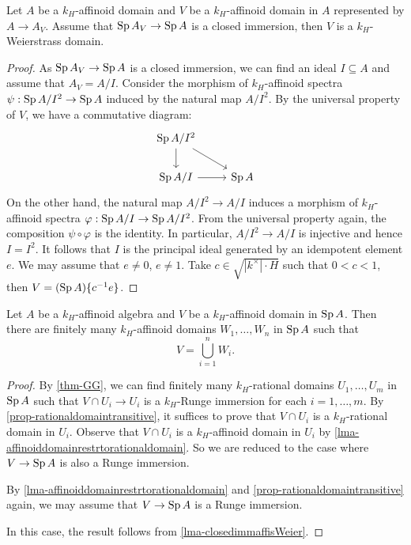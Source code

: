 \begin{lemma}\label{lma-closedimmaffisWeier}
    Let $A$ be a $k_H$-affinoid domain and $V$ be a $k_H$-affinoid domain in $A$ represented by $A\rightarrow A_V$. Assume that $\operatorname{Sp} A_V\rightarrow \operatorname{Sp} A$ is a closed immersion, then $V$ is a $k_H$-Weierstrass domain. 
\end{lemma}
\begin{proof}
    As $\operatorname{Sp} A_V\rightarrow \operatorname{Sp} A$ is a closed immersion, we can find an ideal $I\subseteq  A$ and assume that $A_V=A/I$. Consider the morphism of $k_H$-affinoid spectra $\psi:\operatorname{Sp} A/I^2\rightarrow \operatorname{Sp} A$ induced by the natural map $A/I^2$. By the universal property of $V$, we have a commutative diagram:
    \[
        \begin{tikzcd}
            \Sp A/I^2 \arrow[rd] \arrow[d] &       \\
            \Sp A/I \arrow[r]              & \Sp A
        \end{tikzcd}  
    \]
    On the other hand, the natural map $A/I^2\rightarrow A/I$ induces a morphism of $k_H$-affinoid spectra $\varphi:\operatorname{Sp} A/I\rightarrow \operatorname{Sp} A/I^2$. From the universal property again, the composition $\psi\circ \varphi$ is the identity. In particular, $A/I^2\rightarrow A/I$ is injective and hence $I=I^2$. It follows that $I$ is the principal ideal generated by an idempotent element $e$. We may assume that $e\neq 0$, $e\neq 1$. Take $c\in \sqrt{|k^{\times}|\cdot H}$ such that $0<c<1$, then $V=(\operatorname{Sp} A)\{c^{-1}e\}$.
\end{proof}


\begin{corollary}\label{cor-GG}
    Let $A$ be a $k_H$-affinoid algebra and $V$ be a $k_H$-affinoid domain in $\operatorname{Sp} A$. Then there are finitely many $k_H$-affinoid domains $W_1,\ldots,W_n$ in $\operatorname{Sp} A$ such that
    \[
        V=\bigcup_{i=1}^n W_i.  
    \]
\end{corollary}
\begin{proof}
    By \cref{thm-GG}, we can find finitely many $k_H$-rational domains $U_1,\ldots,U_m$ in $\operatorname{Sp} A$ such that $V\cap U_i\rightarrow U_i$ is a $k_H$-Runge immersion for each $i=1,\ldots,m$. By \cref{prop-rationaldomaintransitive},
    it suffices to prove that $V\cap U_i$ is a $k_H$-rational domain in $U_i$. Observe that $V\cap U_i$ is a $k_H$-affinoid domain in $U_i$ by \cref{lma-affinoiddomainrestrtorationaldomain}. So we are reduced to the case where $V\rightarrow \operatorname{Sp} A$ is also a Runge immersion.

    By \cref{lma-affinoiddomainrestrtorationaldomain} and \cref{prop-rationaldomaintransitive} again, we may assume that $V\rightarrow \operatorname{Sp} A$ is a Runge immersion. 
    
    In this case, the result follows from \cref{lma-closedimmaffisWeier}. 
\end{proof}


